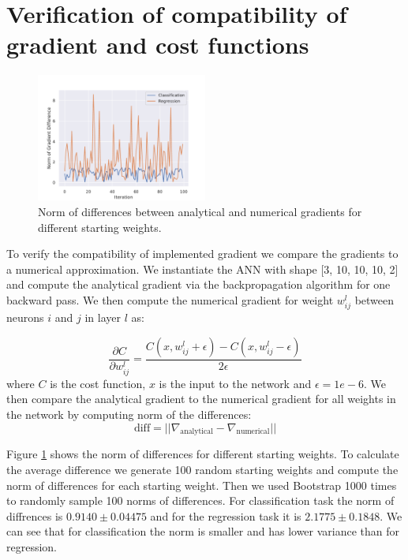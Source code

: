 \documentclass[9pt]{IEEEtran}
\begin{document}
\section{Verification of compatibility of gradient and cost functions}
\begin{figure}[!ht]
    \centering
    \includegraphics[width=0.5\textwidth]{grad_verification.pdf}
    \caption{Norm of differences between analytical and numerical gradients for different starting weights.}
    \label{fig:grad_verification}
\end{figure}
To verify the compatibility of implemented gradient we compare the gradients to a numerical approximation.
We instantiate the ANN with shape [3, 10, 10, 10, 2] and compute the analytical gradient via the backpropagation algorithm for one backward pass.
We then compute the numerical gradient for weight $w_{ij}^{l}$ between neurons $i$ and $j$ in layer $l$ as:

\begin{equation}
    \frac{\partial C}{\partial w_{ij}^{l}} = \frac{C(x, w_{ij}^{l} + \epsilon) - C(x, w_{ij}^{l} - \epsilon)}{2\epsilon}
\end{equation}    
where $C$ is the cost function, $x$ is the input to the network and $\epsilon = 1e-6$. 
We then compare the analytical gradient to the numerical gradient for all weights in the network by computing norm of the differences:
\begin{equation}
    \text{diff} = || \nabla_{\text{analytical}} - \nabla_{\text{numerical}} ||
\end{equation}


Figure \ref{fig:grad_verification} shows the norm of differences for different starting weights.
To calculate the average difference we generate 100 random starting weights and compute the norm of differences for each starting weight.
Then we used Bootstrap 1000 times to randomly sample 100 norms of differences.
For classification task the norm of diffrences is $0.9140 \pm 0.04475$ and for the regression task it is $2.1775 \pm 0.1848$.
We can see that for classification the norm is smaller and has lower variance than for regression.
\end{document}
